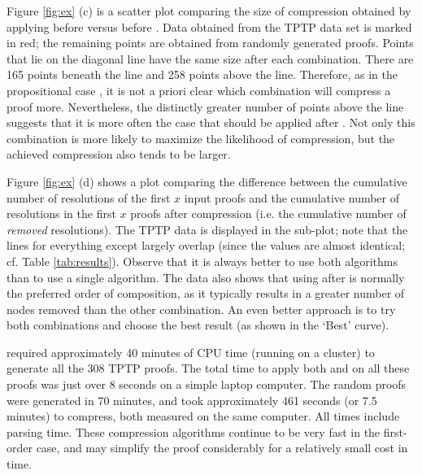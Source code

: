 {Figure \ref{fig:ex} (c) is a scatter plot comparing the size of compression obtained by applying {\FORPI} before {\GFOLU} versus {\GFOLU} before {\FORPI}. Data obtained from the TPTP data set is marked in red; the remaining points are obtained from randomly generated proofs. Points that lie on the diagonal line have the same size after each combination. There are 165 points beneath the line and 258 points above the line. Therefore, as in the propositional case \cite{LURPI}, it is not a priori clear which combination will compress a proof more. Nevertheless, the distinctly greater number of points above the line suggests that it is more often the case that {\FORPI} should be applied after {\GFOLU}. Not only this combination is more likely to maximize the likelihood of compression, but the achieved compression also tends to be larger.

Figure \ref{fig:ex} (d) shows a plot comparing the difference between the cumulative number of resolutions of the first $x$ input proofs and the cumulative number of resolutions in the first $x$ proofs after compression (i.e. the cumulative number of \emph{removed} resolutions). The TPTP data is displayed in the sub-plot; note that the lines for everything except {\FORPI} largely overlap (since the values are almost identical; cf. Table \ref{tab:results}). Observe that it is always better to use both algorithms than to use a single algorithm. The data also shows that using {\FORPI} after {\GFOLU} is normally the preferred order of composition, as it typically results in a greater number of nodes removed than the other combination. An even better approach is to try both combinations and choose the best result (as shown in the `Best' curve).  


{\SPASS} required approximately 40 minutes of CPU time (running on a cluster) to generate all the 308 TPTP proofs. The total time to apply both {\FORPI} and {\GFOLU} on all these proofs was just over 8 seconds on a simple laptop computer. The random proofs were generated in 70 minutes, and took approximately 461 seconds (or 7.5 minutes) to compress, both measured on the same computer.
All times include parsing time. These compression algorithms continue to be very fast in the first-order case, and may simplify the proof considerably for a relatively small cost in time.

}
